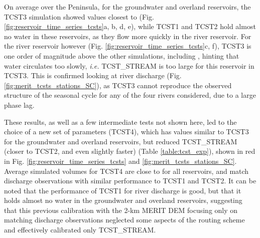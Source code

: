 On average over the Peninsula, for the groundwater and overland reservoirs, the TCST3 simulation showed values closest to \std (Fig. \ref{fig:reservoir_time_series_tcsts}a, b, d, e), while TCST1 and TCST2 hold almost no water in these reservoirs, as they flow more quickly in the river reservoir. For the river reservoir however (Fig. \ref{fig:reservoir_time_series_tcsts}c, f), TCST3 is one order of magnitude above the other simulations, including \std, hinting that water circulates too slowly, \textit{i.e.}  TCST\_STREAM is too large for this reservoir in TCST3. This is confirmed looking at river discharge (Fig. \ref{fig:merit_tcsts_stations_SC}), as TCST3 cannot reproduce the observed structure of the seasonal cycle for any of the four rivers considered, due to a large phase lag. 

These results, as well as a few intermediate tests not shown here, led to the choice of a new set of parameters (TCST4), which has values similar to TCST3 for the groundwater and overland reservoirs, but reduced TCST\_STREAM (closer to TCST2, and even slightly faster) (Table \ref{table:tcst_exp}), shown in red in Fig. \ref{fig:reservoir_time_series_tcsts} and \ref{fig:merit_tcsts_stations_SC}.
Average simulated volumes for TCST4 are close to \std for all reservoirs, and match discharge observations with similar performance to TCST1 and TCST2.
It can be noted that the performance of TCST1 for river discharge is good, but that it holds almost no water in the groundwater and overland reservoirs, suggesting that this previous calibration with the 2-km MERIT DEM focusing only on matching discharge observations \citep{kilic_evaluation_2023} neglected some aspects of the routing scheme and effectively calibrated only TCST\_STREAM.


